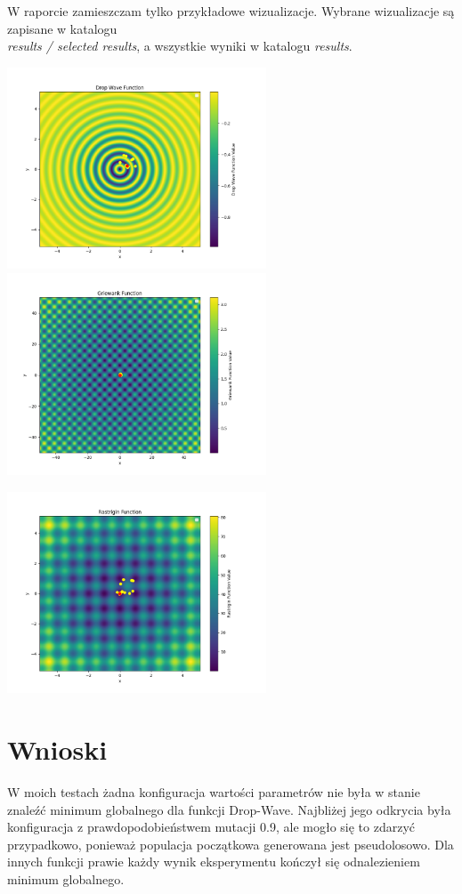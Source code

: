 \documentclass{article}
\begin{document}
W raporcie zamieszczam tylko przykładowe wizualizacje. Wybrane wizualizacje są zapisane w katalogu\\ \textit{results / selected results}, a wszystkie wyniki w katalogu \textit{results}.

\includegraphics[width=7.7cm, height=6cm]{Drop Wave Function.png}
\includegraphics[width=7.7cm, height=6cm]{Griewank Function.png}

\includegraphics[width=7.7cm, height=6cm]{Rastrigin Function.png}

\section{Wnioski}

W moich testach żadna konfiguracja wartości parametrów nie była w stanie znaleźć minimum globalnego dla funkcji Drop-Wave. Najbliżej jego odkrycia była konfiguracja z prawdopodobieństwem mutacji 0.9, ale mogło się to zdarzyć przypadkowo, ponieważ populacja początkowa generowana jest pseudolosowo. Dla innych funkcji prawie każdy wynik eksperymentu kończył się odnalezieniem minimum globalnego.
\end{document}
